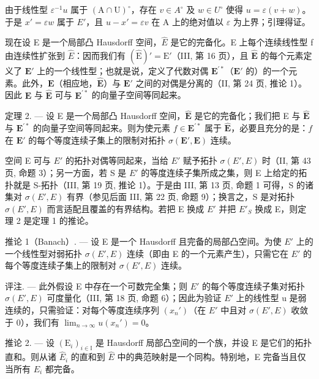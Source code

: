 由于线性型 \(\varepsilon^{-1}u\) 属于 \((\mathrm{A}\cap\mathrm{U})^{\circ}\)，存在 \(v\in A^{\circ}\) 及 \(w\in U^{\circ}\) 使得 \(u=\varepsilon(v+w)\)。于是 \(x'=\varepsilon w\) 属于 \(E'\)，且 \(u-x'=\varepsilon v\) 在 A 上的绝对值以 \(\varepsilon\) 为上界；引理得证。

现在设 E 是一个局部凸 Hausdorff 空间，\(\hat{E}\) 是它的完备化。E 上每个连续线性型 f 由连续性扩张到 \(\hat{E}\)：因而我们有 \((\hat{\mathrm{E}})' = \mathrm{E}'\)（III, 第 16 页），且 \(\hat{\mathbf{E}}\) 的每个元素定义了 \(\mathbf{E}'\) 上的一个线性型；也就是说，定义了代数对偶 \(\mathbf{E}^{\prime *}\)（\(\mathbf{E}'\) 的）的一个元素。此外，\(\mathbf{E}\)（相应地，\(\hat{\mathbf{E}}\)）与 \(\mathbf{E}'\) 之间的对偶是分离的（II, 第 24 页, 推论 1）。因此 \(\mathbf{E}\) 与 \(\hat{\mathbf{E}}\) 可与 \(\mathbf{E}^{\prime *}\) 的向量子空间等同起来。

定理 2. --- 设 E 是一个局部凸 Hausdorff 空间，\(\hat{\mathbf{E}}\) 是它的完备化；我们把 E 与 \(\hat{\mathbf{E}}\) 与 \(\mathbf{E}^{\prime *}\) 的向量子空间等同起来。则为使元素 \(f \in \mathbf{E}^{\prime *}\) 属于 \(\hat{\mathbf{E}}\)，必要且充分的是：\(f\) 在 \(\mathbf{E}'\) 的每个等度连续子集上的限制对拓扑 \(\sigma(\mathbf{E}', \mathbf{E})\) 连续。

空间 E 可与 \(E'\) 的拓扑对偶等同起来，当给 \(E'\) 赋予拓扑 \(\sigma(E', E)\) 时（II, 第 43 页, 命题 3）；另一方面，若 S 是 \(E'\) 的等度连续子集所成之集，则 E 上给定的拓扑就是 S-拓扑（III, 第 19 页, 推论 1）。于是由 III, 第 13 页, 命题 1 可得，S 的诸集对 \(\sigma(E', E)\) 有界（参见后面 III, 第 22 页, 命题 9）；换言之，S 是对拓扑 \(\sigma(E', E)\) 而言适配且覆盖的有界结构。若把 E 换成 \(E'\) 并把 \(E'_{S}\) 换成 E，则定理 2 是定理 1 的推论。

推论 1（Banach）. --- 设 E 是一个 Hausdorff 且完备的局部凸空间。为使 \(E'\) 上的一个线性型对弱拓扑 \(\sigma(E', E)\) 连续（即由 E 的一个元素产生），只需它在 \(E'\) 的每个等度连续子集上的限制对 \(\sigma(E', E)\) 连续。

评注. --- 此外假设 E 中存在一个可数完全集；则 \(E'\) 的每个等度连续子集对拓扑 \(\sigma(E', E)\) 可度量化（III, 第 18 页, 命题 6）；因此为验证 \(E'\) 上的线性型 u 是弱连续的，只需验证：对每个等度连续序列 \((x_{n}')\)（在 \(E'\) 中且对 \(\sigma(E', E)\) 收敛于 0），我们有 \(\lim_{n \to \infty} u(x_{n}') = 0\)。

推论 2. --- 设 \((\mathrm{E}_{i})_{i\in\mathbb{I}}\) 是 Hausdorff 局部凸空间的一个族，并设 E 是它们的拓扑直和。则从诸 \(\hat{E}_{i}\) 的直和到 \(\hat{E}\) 中的典范映射是一个同构。特别地，E 完备当且仅当所有 \(E_{i}\) 都完备。

